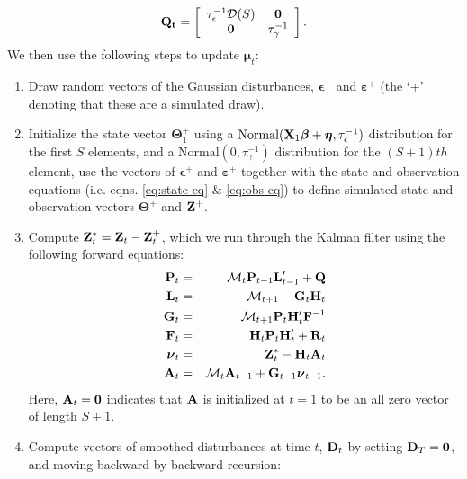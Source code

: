 \documentclass[12pt,fleqn]{article}
\begin{document}
\begin{flushleft}
\begin{eqnarray*}
  \bf{Q}_t = \left[  \begin{array}{cc} \tau_\epsilon^{-1} \mathcal{D}(S) & {\bf 0} \\ {\bf 0} & \tau_\gamma^{-1} \end{array} \right].
\end{eqnarray*}
We then use the following steps to update $\boldsymbol{\mu}_t$:
\begin{enumerate}
  \item Draw random vectors of the Gaussian disturbances, $\boldsymbol{\epsilon}^+$ and $\boldsymbol{\varepsilon}^+$ (the `+' denoting that these are a simulated draw).
  \item Initialize the state vector $\boldsymbol{\Theta}_1^+$ using a $\textrm{Normal}({\bf X}_1 \boldsymbol{\beta} + \boldsymbol{\eta}, \tau_\epsilon^{-1})$ distribution for the first $S$ elements, and a $\textrm{Normal}(0,\tau_\gamma^{-1})$ distribution for the $(S+1)th$ element, use the vectors of $\boldsymbol{\epsilon}^+$ and $\boldsymbol{\varepsilon}^+$ together with the state and observation equations (i.e. eqns. \ref{eq:state-eq} \& \ref{eq:obs-eq}) to define simulated state and observation vectors $\boldsymbol{\Theta}^+$ and ${\bf Z}^+$.
  \item Compute ${\bf Z}_t^* = {\bf Z}_t - {\bf Z}_t^+$, which we run through the Kalman filter using the following
      forward equations:
      \begin{eqnarray*}
        {\bf P}_t & = & \mathcal{M}_t {\bf P}_{t-1} {\bf L}_{t-1}^\prime + {\bf Q} \\
        {\bf L}_t & = & \mathcal{M}_{t+1} - {\bf G}_{t} {\bf H}_{t} \\
        {\bf G}_t & = & \mathcal{M}_{t+1} {\bf P}_t {\bf H}_t^\prime {\bf F}^{-1} \\
        {\bf F}_t & = & {\bf H}_t {\bf P}_t {\bf H}_t^\prime + {\bf R}_t \\
        \boldsymbol{\nu}_t & = & {\bf Z}_t^* - {\bf H}_t {\bf A}_t \\
        {\bf A}_t & = & \mathcal{M}_t {\bf A}_{t-1} + {\bf G}_{t-1} \boldsymbol{\nu}_{t-1}.
      \end{eqnarray*}
      Here, ${\bf A}_t = {\bf 0}$ indicates that ${\bf A}$ is initialized at $t=1$ to be an all zero vector of length $S+1$.
  \item Compute vectors of smoothed disturbances at time $t$, ${\bf D}_t$ by setting ${\bf D}_T ={\bf 0}$, and moving backward by backward recursion:
      \begin{eqnarray*}

\end{eqnarray*}
\end{enumerate}
\end{flushleft}
\end{document}
